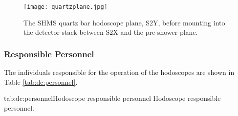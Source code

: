 {\begin{figure}
  \centering
  \texttt{[image: quartzplane.jpg]}
  \caption{\label{fig:quartzplane}The SHMS quartz bar hodoscope plane, S2Y,
before mounting into the detector stack between S2X and the pre-shower
plane.}
\end{figure}

\subsubsection{Responsible Personnel}

The individuals responsible for the operation
of the hodoscopes are shown in Table \ref{tab:dc:personnel}.

\begin{namestab}{tab:dc:personnel}{Hodoscope responsible personnel}{%
      Hodoscope responsible personnel.}
  \DaveMack{}
  \MahlonLong{}
  \SimonaMalace{}
\end{namestab}


}%
